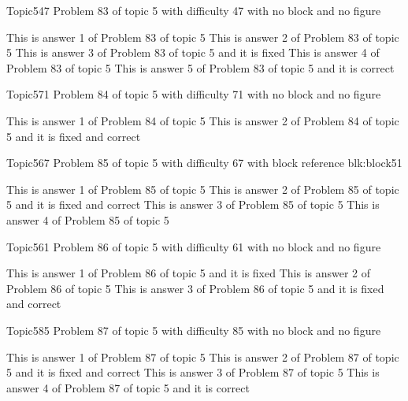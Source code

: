 \documentclass[master]{exam}
\begin{document}
\begin{problem}{Topic5}{47}
	Problem 83 of topic 5 with difficulty 47 with no block and no figure
	\begin{answers}
		\answer This is answer 1 of Problem 83 of topic 5 
		\answer This is answer 2 of Problem 83 of topic 5 
		\answer[fixed] This is answer 3 of Problem 83 of topic 5 and it is fixed
		\answer This is answer 4 of Problem 83 of topic 5 
		\answer[correct] This is answer 5 of Problem 83 of topic 5 and it is correct
	\end{answers}
\end{problem}

\begin{problem}{Topic5}{71}
	Problem 84 of topic 5 with difficulty 71 with no block and no figure
	\begin{answers}
		\answer This is answer 1 of Problem 84 of topic 5 
		 This is answer 2 of Problem 84 of topic 5 and it is fixed and correct
	\end{answers}
\end{problem}

\begin{problem}[requires=blk:block51]{Topic5}{67}
	Problem 85 of topic 5 with difficulty 67 with block reference blk:block51
	\begin{answers}
		\answer This is answer 1 of Problem 85 of topic 5 
		 This is answer 2 of Problem 85 of topic 5 and it is fixed and correct
		\answer This is answer 3 of Problem 85 of topic 5 
		\answer This is answer 4 of Problem 85 of topic 5 
	\end{answers}
\end{problem}

\begin{problem}{Topic5}{61}
	Problem 86 of topic 5 with difficulty 61 with no block and no figure
	\begin{answers}
		\answer[fixed] This is answer 1 of Problem 86 of topic 5 and it is fixed
		\answer This is answer 2 of Problem 86 of topic 5 
		 This is answer 3 of Problem 86 of topic 5 and it is fixed and correct
	\end{answers}
\end{problem}

\begin{problem}{Topic5}{85}
	Problem 87 of topic 5 with difficulty 85 with no block and no figure
	\begin{answers}
		\answer This is answer 1 of Problem 87 of topic 5 
		 This is answer 2 of Problem 87 of topic 5 and it is fixed and correct
		\answer This is answer 3 of Problem 87 of topic 5 
		\answer[correct] This is answer 4 of Problem 87 of topic 5 and it is correct
	\end{answers}
\end{problem}
\end{document}
